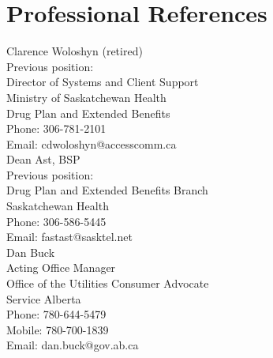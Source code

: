 \documentclass[10.5pt, letterpaper]{article}
\begin{document}
\newpage
\section*{Professional References}
Clarence Woloshyn (retired)\\
Previous position:\\
Director of Systems and Client Support\\
Ministry of Saskatchewan Health\\
Drug Plan and Extended Benefits\\
Phone: 306-781-2101\\
Email: cdwoloshyn@accesscomm.ca\\


Dean Ast, BSP\\
Previous position:\\
Drug Plan and Extended Benefits Branch\\
Saskatchewan Health\\
Phone: 306-586-5445\\
Email: fastast@sasktel.net\\


Dan Buck\\
Acting Office Manager\\
Office of the Utilities Consumer Advocate\\
Service Alberta\\
Phone: 780-644-5479\\
Mobile: 780-700-1839\\
Email: dan.buck@gov.ab.ca
\end{document}
